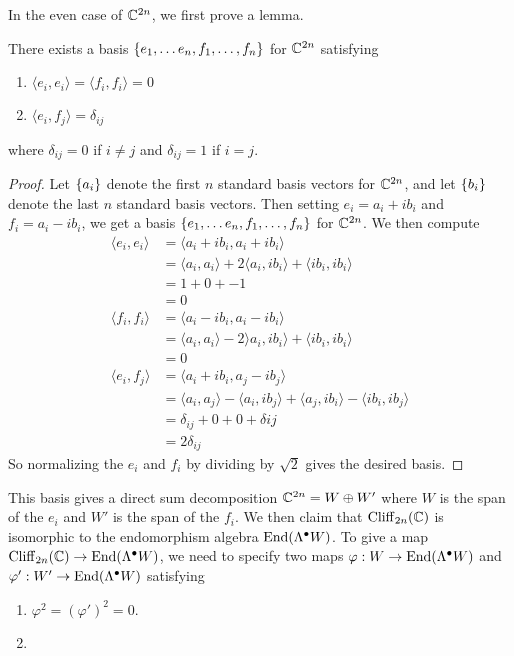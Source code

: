 In the even case of $\mathbb{C}^{2n}$, we first prove a lemma.
%
\begin{lem}
There exists a basis $\left\lbrace e_1,\ldots e_n, f_1, \ldots, f_n \right\rbrace$ for $\mathbb{C}^{2n}$
satisfying
\begin{enumerate}
  \item $\langle e_i, e_i \rangle = \langle f_i, f_i \rangle = 0$
  \item $\langle e_i, f_j \rangle = \delta_{ij}$
\end{enumerate}
where $\delta_{ij} = 0$ if $i \neq j$ and $\delta_{ij} = 1$ if $i = j$.
\end{lem}
%
\begin{proof}
Let $\left\lbrace a_i \right\rbrace$ denote the first $n$ standard basis vectors for $\mathbb{C}^{2n}$, and let
$\left\lbrace b_i \right\rbrace$ denote the last $n$ standard basis vectors. Then setting
$e_i = a_i + ib_i$ and $f_i = a_i - ib_i$, we get a basis
$\left\lbrace e_1, \ldots e_n, f_1, \ldots, f_n \right\rbrace$ for $\mathbb{C}^{2n}$. We then compute
%
\begin{align*}
\langle e_i, e_i \rangle &=\langle a_i + ib_i, a_i + ib_i \rangle \\
&= \langle a_i, a_i \rangle +2\langle a_i, ib_i \rangle + \langle ib_i, ib_i \rangle \\
&= 1 + 0 + -1 \\
&= 0 \\
\langle f_i, f_i \rangle &= \langle a_i - ib_i, a_i - ib_i \rangle \\
&= \langle a_i,a_i \rangle -2\rangle a_i, ib_i \rangle + \langle ib_i,ib_i\rangle \\
&= 0 \\
\langle e_i, f_j \rangle &= \langle a_i + ib_i, a_j - ib_j \rangle \\
&= \langle a_i,a_j \rangle - \langle a_i,ib_j \rangle + \langle a_j, ib_i \rangle
- \langle ib_i, ib_j \rangle \\
&= \delta_{ij} + 0 + 0 + \delta{ij} \\
&= 2\delta_{ij}
\end{align*}
So normalizing the $e_i$ and $f_i$ by dividing by $\sqrt{2}$ gives the desired basis.
%
\end{proof}
%
This basis gives a direct sum decomposition $\mathbb{C}^{2n} = W \oplus W'$ where
$W$ is the span of the $e_i$ and $W'$ is the span of the $f_i$. We then claim
that $\operatorname{Cliff}_{2n}(\mathbb{C})$ is isomorphic to the endomorphism algebra
$\operatorname{End}(\Lambda^\bullet W)$. To give a map $\operatorname{Cliff}_{2n}(\mathbb{C}) \to
\operatorname{End}(\Lambda^\bullet W)$, we need to specify two maps
$\varphi : W \to \operatorname{End}(\Lambda^\bullet W)$ and
$\varphi' : W' \to \operatorname{End}(\Lambda^\bullet W)$ satisfying
%
\begin{enumerate}
  \item $\varphi^2 = (\varphi')^2 = 0$.
  \item
\end{enumerate}
